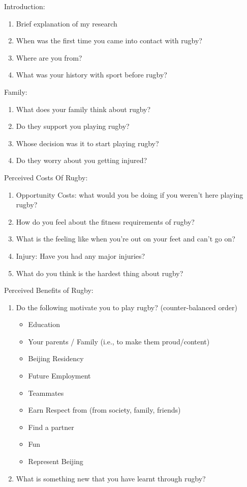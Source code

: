 \begin{CJK}{UTF8}{gbsn}
Introduction:
\begin{enumerate}
  \item Brief explanation of my research
  \item When was the first time you came into contact with rugby?
  \item Where are you from?
  \item What was your history with sport before rugby?
\end{enumerate}

Family:
\begin{enumerate}
  \item What does your family think about rugby?
  \item Do they support you playing rugby?
  \item Whose decision was it to start playing rugby?
  \item Do they worry about you getting injured?
\end{enumerate}


Perceived Costs Of Rugby:
\begin{enumerate}
  \item Opportunity Costs: what would you be doing if you weren't here playing rugby?
  \item How do you feel about the fitness requirements of rugby?
  \item What is the feeling like when you're out on your feet and can't go on?
  \item Injury: Have you had any major injuries?
  \item What do you think is the hardest thing about rugby?
\end{enumerate}


Perceived Benefits of Rugby:
\begin{enumerate}
  \item Do the following motivate you to play rugby? (counter-balanced order)
    \begin{itemize}
      \item Education
      \item Your parents / Family (i.e., to make them proud/content)
      \item Beijing Residency
      \item Future Employment
      \item Teammates
      \item Earn Respect from (from society, family, friends)
      \item Find a partner
      \item Fun
      \item Represent Beijing
    \end{itemize}
    \item What is something new that you have learnt through rugby?
\end{enumerate}



\end{CJK}
